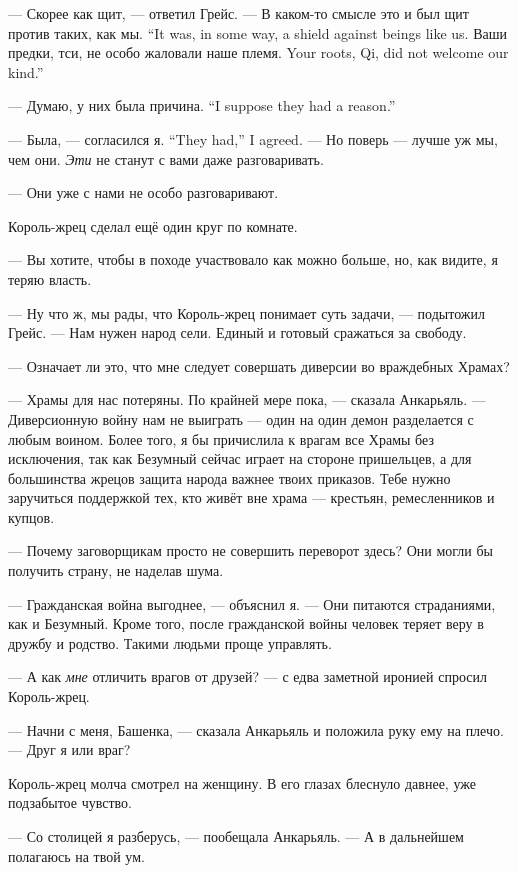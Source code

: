 --- Скорее как щит, --- ответил Грейс.
{--- В каком-то смысле это и был щит против таких, как мы.}
{``It was, in some way, a shield against beings like us.}
{Ваши предки, тси, не особо жаловали наше племя.}
{Your roots, Qi, did not welcome our kind.''}

{--- Думаю, у них была причина.}
{``I suppose they had a reason.''}

{--- Была, --- согласился я.}
{``They had,'' I agreed.}
--- Но поверь --- лучше уж мы, чем они.
\emph{Эти} не станут с вами даже разговаривать.

--- Они уже с нами не особо разговаривают.

Король-жрец сделал ещё один круг по комнате.

--- Вы хотите, чтобы в походе участвовало как можно больше, но, как видите, я теряю власть.

--- Ну что ж, мы рады, что Король-жрец понимает суть задачи, --- подытожил Грейс.
--- Нам нужен народ сели.
Единый и готовый сражаться за свободу.

--- Означает ли это, что мне следует совершать диверсии во враждебных Храмах?

--- Храмы для нас потеряны.
По крайней мере пока, --- сказала Анкарьяль.
--- Диверсионную войну нам не выиграть --- один на один демон разделается с любым воином.
Более того, я бы причислила к врагам все Храмы без исключения, так как Безумный сейчас играет на стороне пришельцев, а для большинства жрецов защита народа важнее твоих приказов.
Тебе нужно заручиться поддержкой тех, кто живёт вне храма --- крестьян, ремесленников и купцов.

--- Почему заговорщикам просто не совершить переворот здесь?
Они могли бы получить страну, не наделав шума.

--- Гражданская война выгоднее, --- объяснил я.
--- Они питаются страданиями, как и Безумный.
Кроме того, после гражданской войны человек теряет веру в дружбу и родство.
Такими людьми проще управлять.

--- А как \emph{мне} отличить врагов от друзей? --- с едва заметной иронией спросил Король-жрец.

--- Начни с меня, Башенка, --- сказала Анкарьяль и положила руку ему на плечо.
--- Друг я или враг?

Король-жрец молча смотрел на женщину.
В его глазах блеснуло давнее, уже подзабытое чувство.

--- Со столицей я разберусь, --- пообещала Анкарьяль.
--- А в дальнейшем полагаюсь на твой ум.

